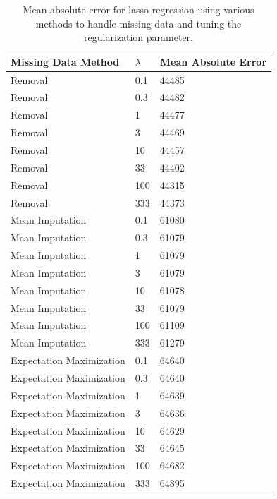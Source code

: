\documentclass{acm_proc_article-sp}
\begin{document}
	\begin{center}
	\begin{table}	
    \begin{tabular}{| l | l | l |}
    \hline
    Missing Data Method & $\lambda$ & Mean Absolute Error \\ \hline
    \hline
	Removal & 0.1 & 44485 \\
	\hline
	Removal & 0.3 & 44482 \\
	\hline
	Removal & 1 & 44477 \\
	\hline
	Removal & 3 & 44469 \\
	\hline
	Removal & 10 & 44457 \\
	\hline
	Removal & 33 & 44402 \\
	\hline
	Removal & 100 & 44315 \\
	\hline
	Removal & 333 & 44373 \\
	\hline
    Mean Imputation & 0.1 & 61080\\
    \hline
 Mean Imputation & 0.3 & 61079\\
 \hline
 Mean Imputation & 1 & 61079\\
 \hline
 Mean Imputation & 3 & 61079\\
 \hline
 Mean Imputation & 10 & 61078\\
 \hline
 Mean Imputation & 33 & 61079\\
 \hline
 Mean Imputation & 100 & 61109 \\
 \hline
 Mean Imputation & 333 & 61279 \\
    \hline
    Expectation Maximization & 0.1 & 64640\\
    \hline
Expectation Maximization & 0.3 & 64640\\
\hline
Expectation Maximization & 1 & 64639\\
\hline
Expectation Maximization & 3 & 64636\\
\hline
Expectation Maximization & 10 & 64629\\
\hline
Expectation Maximization & 33 & 64645\\
\hline
Expectation Maximization & 100 & 64682\\
\hline
Expectation Maximization & 333 & 64895 \\
    \hline
    \end{tabular}
    \caption{Mean absolute error for lasso regression using various methods to handle missing data and tuning the regularization parameter.}
    \label{fig:lassores}
    \end{table}
\end{center}
	
\end{document}
